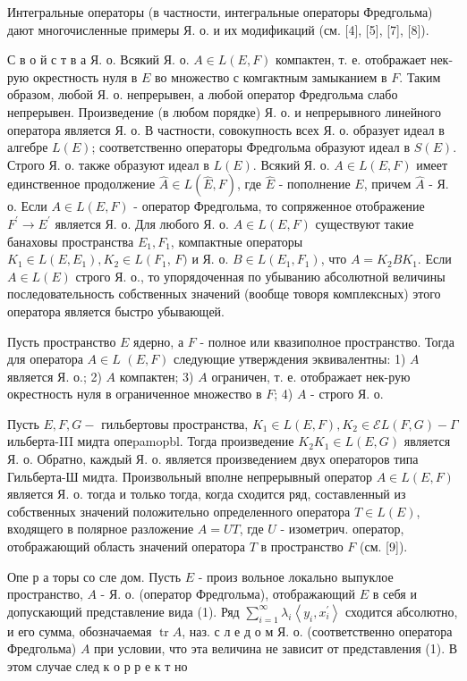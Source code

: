 \documentclass[10pt]{article}
\begin{document}
Интегральные операторы (в частности, интегральные операторы Фредгольма) дают многочисленные примеры Я. о. и их модификаций (см. [4], [5], [7], [8]).



С в о й с т в а Я. о. Всякий Я. о. $A \in L(E, F)$ компактен, т. е. отображает нек-рую окрестность нуля в $E$ во множество с комгактным замыканием в $F$. Таким образом, любой Я. о. непрерывен, а любой оператор Фредгольма слабо непрерывен. Произведение (в любом порядке) Я. о. и непрерывного линейного оператора является Я. о. В частности, совокупность всех Я. о. образует идеал в алгебре $L(E)$; соответственно операторы Фредгольма образуют идеал в $S(E)$. Строго Я. о. также образуют идеал в $L(E)$. Всякий Я. о. $A \in L(E, F)$ имеет единственное продолжение $\widehat{A} \in L(\widehat{E}, F)$, где $\hat{E}$ - пополнение $E$, причем $\hat{A}$ - Я. о. Если $A \in L(E, F)$ - оператор Фредгольма, то сопряженное отображение $F^{\prime} \rightarrow E^{\prime}$ является Я. о. Для любого Я. о. $A \in L(E, F)$ существуют такие банаховы пространства $E_{1}, F_{1}$, компактные операторы $K_{1} \in L\left(E, E_{1}\right), K_{2} \in L\left(F_{1}\right.$, $F)$ и Я. о. $B \in L\left(E_{1}, F_{1}\right)$, что $A=K_{2} B K_{1}$. Если $A \in L(E)$ строго Я. о., то упорядоченная по убыванию абсолютной величины последовательность собственных значений (вообще товоря комплексных) этого оператора является быстро убывающей.



Пусть пространство $E$ ядерно, а $F$ - полное или квазиполное пространство. Тогда для оператора $A \in L$ $(E, F)$ следующие утверждения эквивалентны: 1) $A$ является Я. о.; 2) $A$ компактен; 3) $A$ ограничен, т. е. отображает нек-рую окрестность нуля в ограниченное множество в $F$; 4) $A$ - строго Я. о.



Пусть $E, F, G-$ гильбертовы пространства, $K_{1} \in L(E, F), K_{2} \in \mathcal{E} L(F, G)-\Gamma$ ильберта-III мидта опеpamopbl. Тогда произведение $K_{2} K_{1} \in L(E, G)$ является Я. о. Обратно, каждый Я. о. является произведением двух операторов типа Гильберта-Ш мидта. Произвольный вполне непрерывный оператор $A \in L(E, F)$ является Я. о. тогда и только тогда, когда сходится ряд, составленный из собственных значений положительно определенного оператора $T \in L(E)$, входящего в полярное разложение $A=U T$, где $U$ - изометрич. оператор, отображающий область значений оператора $T$ в пространство $F$ (см. [9]).



Опе р а торы со сле дом. Пусть $E$ - произ вольное локально выпуклое пространство, $A$ - Я. о. (оператор Фредгольма), отображающий $E$ в себя и допускающий представление вида (1). Ряд $\sum_{i=1}^{\infty} \lambda_{i}\left\langle y_{i}, x_{i}^{\prime}\right\rangle$ сходится абсолютно, и его сумма, обозначаемая $\operatorname{tr} A$, наз. с л е д о м Я. о. (соответственно оператора Фредгольма) $A$ при условии, что эта величина не зависит от представления (1). В этом случае след к о р р е к т но
\end{document}
